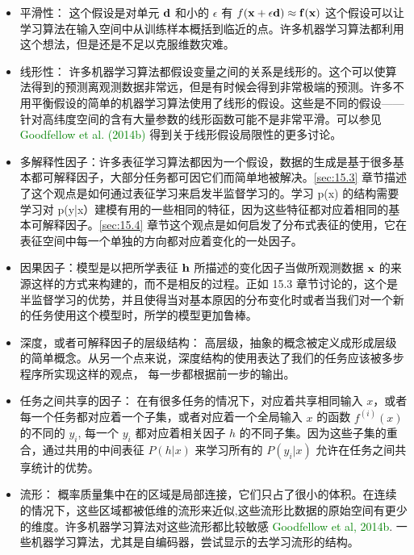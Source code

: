 \begin{itemize}
	\item 平滑性： 这个假设是对单元 $\bf d$ 和小的 $\epsilon$ 有 $f(\bf x+\epsilon d)\approx f(x)$ 这个假设可以让学习算法在输入空间中从训练样本概括到临近的点。许多机器学习算法都利用这个想法，但是还是不足以克服维数灾难。

	\item 线形性： 许多机器学习算法都假设变量之间的关系是线形的。这个可以使算法得到的预测离观测数据非常远，但是有时候会得到非常极端的预测。许多不用平衡假设的简单的机器学习算法使用了线形的假设。这些是不同的假设——针对高纬度空间的含有大量参数的线形函数可能不是非常平滑。可以参见 \textcolor{green}{Goodfellow et al. (2014b)} 得到关于线形假设局限性的更多讨论。

	\item 多解释性因子：许多表征学习算法都因为一个假设，数据的生成是基于很多基本都可解释因子，大部分任务都可因它们而简单地被解决。\ref{sec:15.3} 章节描述了这个观点是如何通过表征学习来启发半监督学习的。学习 p(x) 的结构需要学习对 p(y|x）建模有用的一些相同的特征，因为这些特征都对应着相同的基本可解释因子。\ref{sec:15.4} 章节这个观点是如何启发了分布式表征的使用，它在表征空间中每一个单独的方向都对应着变化的一处因子。

	\item 因果因子：模型是以把所学表征 $\bf h$ 所描述的变化因子当做所观测数据 $\bf x$ 的来源这样的方式来构建的，而不是相反的过程。正如 15.3 章节讨论的，这个是半监督学习的优势，并且使得当对基本原因的分布变化时或者当我们对一个新的任务使用这个模型时，所学的模型更加鲁棒。

	\item 深度，或者可解释因子的层级结构： 高层级，抽象的概念被定义成形成层级的简单概念。从另一个点来说，深度结构的使用表达了我们的任务应该被多步程序所实现这样的观点， 每一步都根据前一步的输出。

	\item 任务之间共享的因子： 在有很多任务的情况下，对应着共享相同输入 $x$，或者每一个任务都对应着一个子集，或者对应着一个全局输入 $x$ 的函数 $f^{(i)}(x)$ 的不同的 $y_i$, 每一个 $y_i$ 都对应着相关因子 $h$ 的不同子集。因为这些子集的重合，通过共用的中间表征 $P(h|x)$ 来学习所有的 $P(y_i|x)$ 允许在任务之间共享统计的优势。 

	\item 流形： 概率质量集中在的区域是局部连接，它们只占了很小的体积。在连续的情况下，这些区域都被低维的流形来近似,这些流形比数据的原始空间有更少的维度。许多机器学习算法对这些流形都比较敏感 \textcolor{green}{Goodfellow et al, 2014b}. 一些机器学习算法，尤其是自编码器，尝试显示的去学习流形的结构。


\end{itemize}
